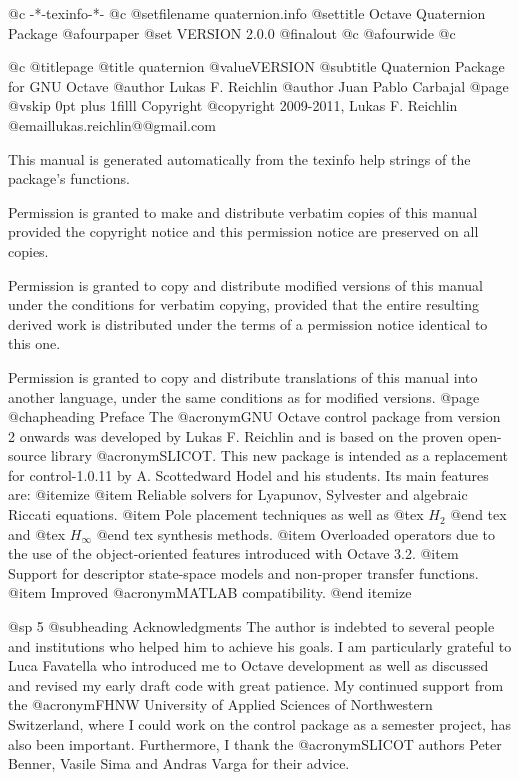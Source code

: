    @c -*-texinfo-*-
@c %
@setfilename quaternion.info
@settitle Octave Quaternion Package
@afourpaper
@set VERSION 2.0.0
@finalout
@c @afourwide
@c %

@c %
@titlepage
@title quaternion @value{VERSION}
@subtitle Quaternion Package for GNU Octave
@author Lukas F. Reichlin
@author Juan Pablo Carbajal
@page
@vskip 0pt plus 1filll
Copyright @copyright{} 2009-2011, Lukas F. Reichlin @email{lukas.reichlin@@gmail.com}

This manual is generated automatically from the texinfo help strings
of the package's functions.

Permission is granted to make and distribute verbatim copies of
this manual provided the copyright notice and this permission notice
are preserved on all copies.

Permission is granted to copy and distribute modified versions of this
manual under the conditions for verbatim copying, provided that the entire
resulting derived work is distributed under the terms of a permission
notice identical to this one.

Permission is granted to copy and distribute translations of this manual
into another language, under the same conditions as for modified versions.
@page
@chapheading Preface
The @acronym{GNU} Octave control package from version 2 onwards was
developed by Lukas F. Reichlin and is based on the proven open-source
library @acronym{SLICOT}. This new package is intended as a replacement
for control-1.0.11 by A. Scottedward Hodel and his students.
Its main features are:
@itemize
@item Reliable solvers for Lyapunov, Sylvester and algebraic Riccati equations.
@item Pole placement techniques as well as @tex $ H_2 $ @end tex
and @tex $ H_{\infty} $ @end tex
synthesis methods.
@item Overloaded operators due to the use of the object-oriented features
introduced with Octave 3.2.
@item Support for descriptor state-space models and non-proper transfer functions.
@item Improved @acronym{MATLAB} compatibility.
@end itemize

@sp 5
@subheading Acknowledgments
The author is indebted to several people and institutions who helped
him to achieve his goals. I am particularly grateful to Luca Favatella
who introduced me to Octave development as well as discussed and revised
my early draft code with great patience. My continued support from the
@acronym{FHNW} University of Applied Sciences of Northwestern Switzerland,
where I could work on the control package as a semester project, has also
been important. Furthermore, I thank the @acronym{SLICOT} authors
Peter Benner, Vasile Sima and Andras Varga for their advice.


